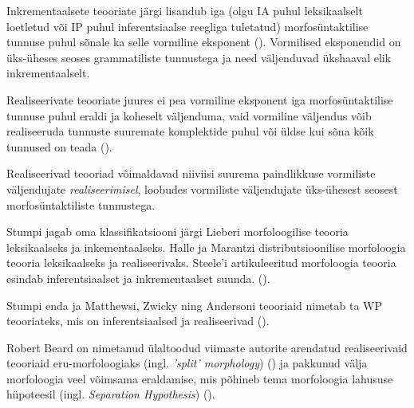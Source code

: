\documentclass[12pt,a4paper]{article}
\begin{document}
Inkrementaalsete teooriate järgi lisandub iga (olgu IA puhul leksikaalselt loetletud või IP puhul inferentsiaalse reegliga tuletatud) morfosüntaktilise tunnuse puhul sõnale ka selle vormiline eksponent (\cite[2]{stump_inflectional_2001}). Vormilised eksponendid on üks-üheses seoses grammatiliste tunnustega ja need väljenduvad ükshaaval elik inkrementaalselt.

Realiseerivate teooriate juures ei pea vormiline eksponent iga morfosüntaktilise tunnuse puhul eraldi ja koheselt väljenduma, vaid vormiline väljendus võib realiseeruda tunnuste suuremate komplektide puhul või üldse kui sõna kõik tunnused on teada (\cite[2]{stump_inflectional_2001}).

Realiseerivad teooriad võimaldavad niiviisi suurema paindlikkuse vormiliste väljendujate \textit{realiseerimisel}, loobudes vormiliste väljendujate üks-ühesest seosest morfosüntaktiliste tunnustega.

Stumpi jagab oma klassifikatsiooni järgi Lieberi morfoloogilise teooria leksikaalseks ja inkementaalseks. Halle ja Marantzi distributsioonilise morfoloogia teooria leksikaalseks ja realiseerivaks. Steele'i artikuleeritud morfoloogia teooria esindab inferentsiaalset ja inkrementaalset suunda. (\cite[2--3]{stump_inflectional_2001}).

Stumpi enda ja Matthewsi, Zwicky ning Andersoni teooriaid nimetab ta WP teooriateks, mis on inferentsiaalsed ja realiseerivad (\cite[3]{stump_inflectional_2001}).


Robert Beard on nimetanud ülaltoodud viimaste autorite arendatud realiseerivaid teooriaid eru-morfoloogiaks (ingl. \textit{'split' morphology}) (\cite[20]{beard_morpheme_1987}) ja pakkunud välja morfoloogia veel võimsama eraldamise, mis põhineb tema morfoloogia lahususe hüpoteesil (ingl. \textit{Separation Hypothesis}) (\cite{beard_lexeme-morpheme_1995}).
\end{document}
